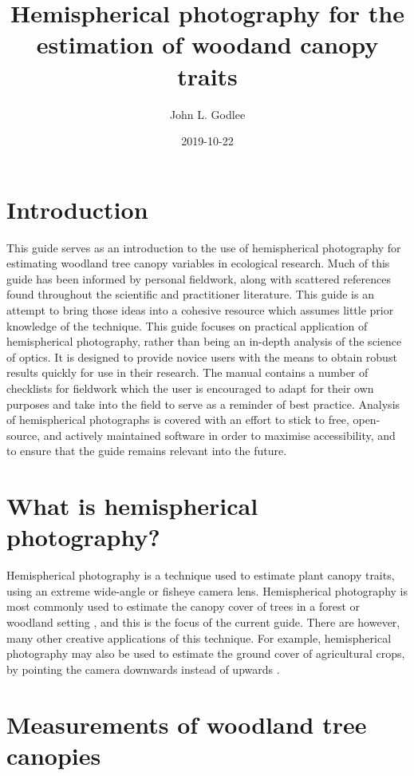 \documentclass{article}
\title{Hemispherical photography for the estimation of woodand canopy traits}
\date{2019-10-22}
\author{John L. Godlee}
\begin{document}
\maketitle

\tableofcontents
\newpage

\section{Introduction}

This guide serves as an introduction to the use of hemispherical photography for estimating woodland tree canopy variables in ecological research. Much of this guide has been informed by personal fieldwork, along with scattered references found throughout the scientific and practitioner literature. This guide is an attempt to bring those ideas into a cohesive resource which assumes little prior knowledge of the technique. This guide focuses on practical application of hemispherical photography, rather than being an in-depth analysis of the science of optics. It is designed to provide novice users with the means to obtain robust results quickly for use in their research. The manual contains a number of checklists for fieldwork which the user is encouraged to adapt for their own purposes and take into the field to serve as a reminder of best practice. Analysis of hemispherical photographs is covered with an effort to stick to free, open-source, and actively maintained software in order to maximise accessibility, and to ensure that the guide remains relevant into the future.

\section{What is hemispherical photography?}

Hemispherical photography is a technique used to estimate plant canopy traits, using an extreme wide-angle or fisheye camera lens. Hemispherical photography is most commonly used to estimate the canopy cover of trees in a forest or woodland setting \citep{Seidel2011, Macfarlane2014}, and this is the focus of the current guide. There are however, many other creative applications of this technique. For example, hemispherical photography may also be used to estimate the ground cover of agricultural crops, by pointing the camera downwards instead of upwards \citep{Demarez2008}.

\section{Measurements of woodland tree canopies}
\end{document}
